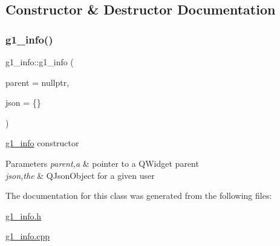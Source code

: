 \subsection{Constructor \& Destructor Documentation}
\mbox{\label{classg1__info_ae492d616a5f3dd0dc3177fdae814288d}} 
\subsubsection{\texorpdfstring{g1\+\_\+info()}{g1\_info()}}
{\footnotesize\ttfamily g1\+\_\+info\+::g1\+\_\+info (\begin{DoxyParamCaption}\item[{Q\+Widget $\ast$}]{parent = {\ttfamily nullptr},  }\item[{Q\+Json\+Object}]{json = {\ttfamily \{\}} }\end{DoxyParamCaption})\hspace{0.3cm}{\ttfamily [explicit]}}



\hyperlink{classg1__info}{g1\+\_\+info} constructor 


\begin{DoxyParams}{Parameters}
{\em parent,a} & pointer to a Q\+Widget parent \\
\hline
{\em json,the} & Q\+Json\+Object for a given user \\
\hline
\end{DoxyParams}


The documentation for this class was generated from the following files\+:\begin{DoxyCompactItemize}
\item 
\hyperlink{g1__info_8h}{g1\+\_\+info.\+h}\item 
\hyperlink{g1__info_8cpp}{g1\+\_\+info.\+cpp}\end{DoxyCompactItemize}
